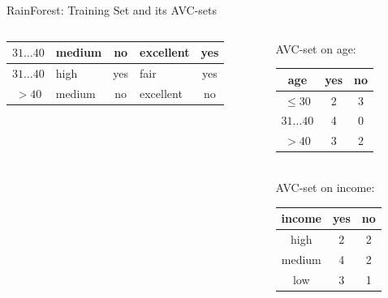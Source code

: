 \begin{frame}{RainForest: Training Set and its AVC-sets}
\begin{columns}
\begin{column}{0.6\textwidth}
\begin{tabular}{|c|l|c|l|c|}
        \cellcolor{yellow!20}$31\ldots40$ & \cellcolor{yellow!20}medium & \cellcolor{yellow!20}no & \cellcolor{yellow!20}excellent & \cellcolor{green!20}yes \\\hline
        \cellcolor{yellow!20}$31\ldots40$ & \cellcolor{yellow!20}high & \cellcolor{yellow!20}yes & \cellcolor{yellow!20}fair & \cellcolor{green!20}yes \\\hline
        \cellcolor{yellow!20}$>40$ & \cellcolor{yellow!20}medium & \cellcolor{yellow!20}no & \cellcolor{yellow!20}excellent & \cellcolor{red!20}no \\\hline
      \end{tabular}
    \end{column}
    \begin{column}{0.3\textwidth}
      \vspace{-3cm}

      \centering
      AVC-set on age:\\
      \begin{tabular}{|c|c|c|}
        \hline
        age & yes & no \\\hline
        $\leq 30$ & 2 & 3 \\\hline
        $31\ldots40$ & 4 & 0 \\\hline
        $>40$ & 3 & 2 \\\hline
      \end{tabular}\\[1cm]
      AVC-set on income:\\
      \begin{tabular}{|c|c|c|}
        \hline
        income & yes & no \\\hline
        high & 2 & 2 \\\hline
        medium & 4 & 2 \\\hline
        low & 3 & 1 \\\hline
      \end{tabular}
    \end{column}
  \end{columns}
\end{frame}

